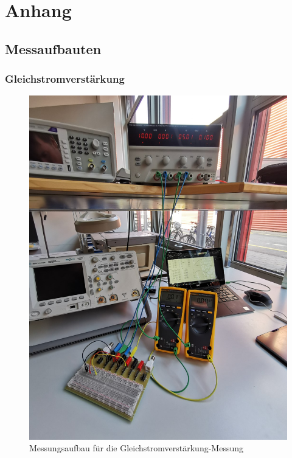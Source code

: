 \documentclass[../main.tex]{subfiles}
\begin{document}
\section{Anhang}
\appendix
\renewcommand{\thesubsection}{\Alph{subsection}}
\subsection{Messaufbauten}

\subsubsection{Gleichstromverstärkung}

\begin{figure}[h]
    \centering
    \includegraphics[scale=0.075]{assets/task1_DC_amplification/task1.jpg}
    \caption{Messungsaufbau für die Gleichstromverstärkung-Messung}
    \label{fig:setup_task1}
\end{figure}
\newpage
\end{document}
